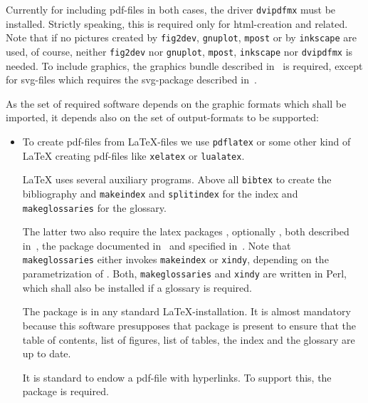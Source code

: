 \documentclass[12pt]{book}
\renewcommand{\index}[1]{ }
\begin{document}
Currently for including pdf-files in both cases, 
the driver \texttt{dvipdfmx} must be installed. 
Strictly speaking, this is required only for html-creation and related. 
Note that if no pictures created by \texttt{fig2dev}, \texttt{gnuplot}, 
\texttt{mpost} or by \texttt{inkscape} are used, of course, 
neither \texttt{fig2dev} nor \texttt{gnuplot},
\texttt{mpost}, \texttt{inkscape} 
nor \texttt{dvipdfmx} is needed. 
To include graphics, the graphics bundle described in~\cite{GraX} is required, 
except for svg-files which requires the svg-package 
described in~\cite{SvgP}. 

As the set of required software depends on the graphic formats 
which shall be imported, 
it depends also on the set of output-formats 
to be supported: 
%
\begin{itemize}
\item
To create pdf-files from \LaTeX-files we use \texttt{pdflatex} 
or some other kind of \LaTeX{} creating pdf-files 
like \texttt{xelatex} or \texttt{lualatex}. 
\index{pdflatex}\index{xelatex}\index{lualatex} 
\LaTeX{} uses several auxiliary programs. 
Above all \texttt{bibtex} to create the bibliography 
and \texttt{makeindex} and \texttt{splitindex} for the index 
and \texttt{makeglossaries} for the glossary. 
\index{bibtex}\index{makeindex}\index{splitindex}\index{makeglossaries}
The latter two 
also require the latex packages , optionally , 
both described in~\cite{MkidxShIdxP}, 
the package  documented in~\cite{SplitidxP}
and  specified in~\cite{GloP}. 
Note that \texttt{makeglossaries} either invokes \texttt{makeindex} 
or \texttt{xindy}, depending on the parametrization of . 
Both, \texttt{makeglossaries} and \texttt{xindy} are written in Perl, 
which shall also be installed if a glossary is required. 

The package  is in any standard \LaTeX-installation. 
It is almost mandatory 
because this software presupposes that package is present  
to ensure that the table of contents, list of figures, list of tables, 
the index and the glossary are up to date. 

It is standard to endow a pdf-file with hyperlinks. 
To support this, the package  is required. 


\end{itemize}
\end{document}
